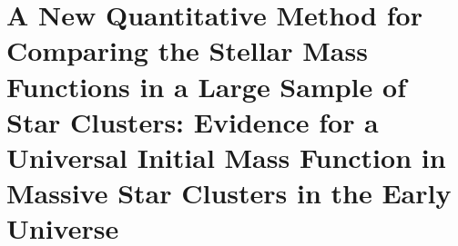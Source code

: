 \pagestyle{fancy}
\headheight 20pt
\chead{}
\lfoot{}
\cfoot{\thepage}
\rfoot{}
\renewcommand{\headrulewidth}{0.1pt}
\renewcommand{\footrulewidth}{0.1pt}

\chapter{A New Quantitative Method for Comparing the Stellar Mass
  Functions in a Large Sample of Star Clusters:  Evidence for a
  Universal Initial Mass Function in Massive Star Clusters in the
  Early Universe} \label{chapter6}
\thispagestyle{fancy}

%





%

